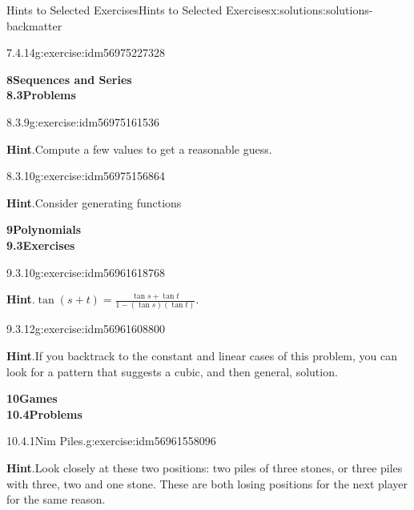 \documentclass[twoside,10pt,]{book}
\newcommand{\blocktitlefont}{\relax}
\numberwithin{equation}{section}
\begin{document}
\begin{solutions-chapter}{Hints  to Selected Exercises}{}{Hints  to Selected Exercises}{}{}{x:solutions:solutions-backmatter}
\begin{divisionsolution}{7.4.14}{}{g:exercise:idm56975227328}
\end{divisionsolution}%
\par\medskip
\noindent\textbf{\Large{}8\space\textperiodcentered\space{}Sequences and Series\\
8.3\space\textperiodcentered\space{}Problems}
\begin{divisionsolution}{8.3.9}{}{g:exercise:idm56975161536}%
\par\smallskip%
\noindent\textbf{\blocktitlefont Hint}.\hypertarget{g:hint:idm56975160640-back}{}\quad{}Compute a few values to get a reasonable guess.%
\end{divisionsolution}%
\begin{divisionsolution}{8.3.10}{}{g:exercise:idm56975156864}%
\par\smallskip%
\noindent\textbf{\blocktitlefont Hint}.\hypertarget{g:hint:idm56975153952-back}{}\quad{}Consider generating functions%
\end{divisionsolution}%
\par\medskip
\noindent\textbf{\Large{}9\space\textperiodcentered\space{}Polynomials\\
9.3\space\textperiodcentered\space{}Exercises}
\begin{divisionsolution}{9.3.10}{}{g:exercise:idm56961618768}%
\par\smallskip%
\noindent\textbf{\blocktitlefont Hint}.\hypertarget{g:hint:idm56961617936-back}{}\quad{}\(\tan(s+t)=\frac{\tan  s + \tan  t }{1-(\tan  s )(\tan  t)}\).%
\end{divisionsolution}%
\begin{divisionsolution}{9.3.12}{}{g:exercise:idm56961608800}%
\par\smallskip%
\noindent\textbf{\blocktitlefont Hint}.\hypertarget{g:hint:idm56961603008-back}{}\quad{}If you backtrack to the constant and linear cases of this problem, you can look for a pattern that suggests a cubic, and then general, solution.%
\end{divisionsolution}%
\par\medskip
\noindent\textbf{\Large{}10\space\textperiodcentered\space{}Games\\
10.4\space\textperiodcentered\space{}Problems}
\begin{divisionsolution}{10.4.1}{Nim Piles.}{g:exercise:idm56961558096}%
\par\smallskip%
\noindent\textbf{\blocktitlefont Hint}.\hypertarget{g:hint:idm56961556848-back}{}\quad{}Look closely at these two positions: two piles of three stones, or three piles with three, two and one stone.   These are both losing positions for the next player for the same reason.%

\end{divisionsolution}
\end{solutions-chapter}
\end{document}

